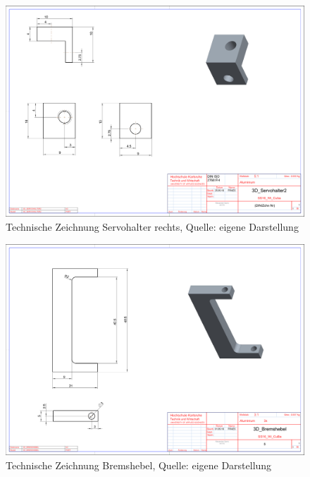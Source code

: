 \begin{landscape}
	\begin{figure} 
	\begin{center}
	\includegraphics[width=1.5\textwidth]{img/3d_servohalter2.pdf}
	\end{center}
	\caption{Technische Zeichnung Servohalter rechts, Quelle: eigene Darstellung}
	\end{figure} 
		
	\begin{figure} 
	\begin{center}
	\includegraphics[width=1.5\textwidth]{img/3d_bremshebel.pdf}
	\end{center}
	\caption{Technische Zeichnung Bremshebel, Quelle: eigene Darstellung}
	\end{figure}  
	

\end{landscape}
